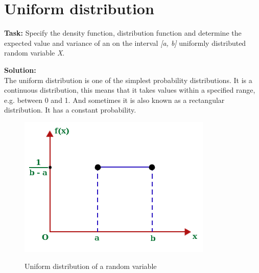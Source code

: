 \section{Uniform distribution}
\noindent \textbf{Task:} Specify the density function, distribution function and determine the expected value and variance of an on the interval \textit{[a, b]} uniformly distributed random variable \textit{X}. 

\noindent \textbf{Solution:}\\
\noindent The uniform distribution is one of the simplest probability distributions. It is a continuous distribution, this means that it takes values within a specified range, e.g. between 0 and 1. And sometimes it is also known as a rectangular distribution. It has a constant probability.\\
\begin{figure}[H]
\begin{center}
\includegraphics[scale=0.55]{fig10.png}\\
\caption{Uniform distribution of a random variable}
\label{Uniform distribution of a random variable}
\end{center}
\end{figure}
